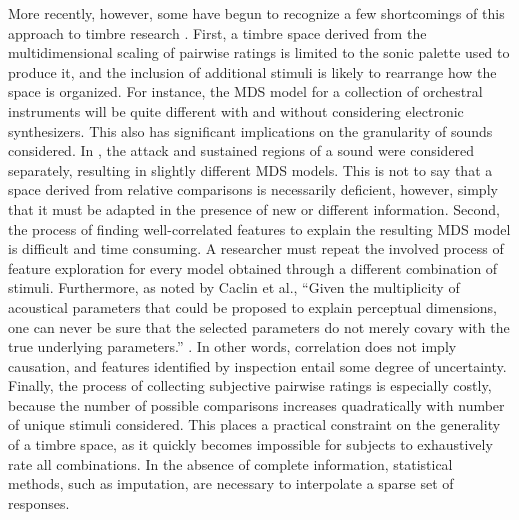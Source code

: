 More recently, however, some have begun to recognize a few shortcomings of this approach to timbre research \cite{Glennon2014Evolving}.
First, a timbre space derived from the multidimensional scaling of pairwise ratings is limited to the sonic palette used to produce it, and the inclusion of additional stimuli is likely to rearrange how the space is organized.
For instance, the MDS model for a collection of orchestral instruments will be quite different with and without considering electronic synthesizers.
This also has significant implications on the granularity of sounds considered.
In \cite{Iverson1993Isolating}, the attack and sustained regions of a sound were considered separately, resulting in slightly different MDS models.
This is not to say that a space derived from relative comparisons is necessarily deficient, however, simply that it must be adapted in the presence of new or different information.
Second, the process of finding well-correlated features to explain the resulting MDS model is difficult and time consuming.
A researcher must repeat the involved process of feature exploration for every model obtained through a different combination of stimuli.
Furthermore, as noted by Caclin et al., ``Given the multiplicity of acoustical parameters that could be proposed to explain perceptual dimensions, one can never be sure that the selected parameters do not merely covary with the true underlying parameters.'' \cite{Caclin2005Acoustic}.
In other words, correlation does not imply causation, and features identified by inspection entail some degree of uncertainty.
Finally, the process of collecting subjective pairwise ratings is especially costly, because the number of possible comparisons increases quadratically with number of unique stimuli considered.
This places a practical constraint on the generality of a timbre space, as it quickly becomes impossible for subjects to exhaustively rate all combinations.
In the absence of complete information, statistical methods, such as imputation, are necessary to interpolate a sparse set of responses.



